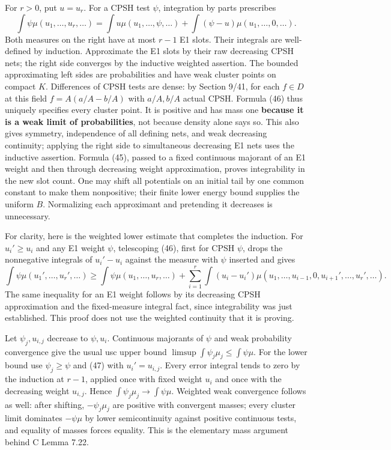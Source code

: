 \documentclass[
  10pt,
]{article}
\begin{document}
For \(r>0\), put \(u=u_r\). For a CPSH test \(\psi\), integration by
parts prescribes \[
 \int\psi\mu(u_1,\ldots,u_r,\ldots)
 =\int u\mu(u_1,\ldots,\psi,\ldots)
  +\int(\psi-u)\mu(u_1,\ldots,0,\ldots).                                                     \tag{46}
\] Both measures on the right have at most \(r-1\) E1 slots. Their
integrals are well-defined by induction. Approximate the E1 slots by
their raw decreasing CPSH nets; the right side converges by the
inductive weighted assertion. The bounded approximating left sides are
probabilities and have weak cluster points on compact \(K\). Differences
of CPSH tests are dense: by Section 9/41, for each \(f\in D\) at this
field \(f=A(a/A-b/A)\) with \(a/A,b/A\) actual CPSH. Formula (46) thus
uniquely specifies every cluster point. It is positive and has mass one
\textbf{because it is a weak limit of probabilities}, not because
density alone says so. This also gives symmetry, independence of all
defining nets, and weak decreasing continuity; applying the right side
to simultaneous decreasing E1 nets uses the inductive assertion. Formula
(45), passed to a fixed continuous majorant of an E1 weight and then
through decreasing weight approximation, proves integrability in the new
slot count. One may shift all potentials on an initial tail by one
common constant to make them nonpositive; their finite lower energy
bound supplies the uniform \(B\). Normalizing each approximant and
pretending it decreases is unnecessary.

For clarity, here is the weighted lower estimate that completes the
induction. For \(u_i'\geq u_i\) and any E1 weight \(\psi\), telescoping
(46), first for CPSH \(\psi\), drops the nonnegative integrals of
\(u_i'-u_i\) against the measure with \(\psi\) inserted and gives \[
 \int\psi\mu(u_1',\ldots,u_r',\ldots)
 \geq\int\psi\mu(u_1,\ldots,u_r,\ldots)
  +\sum_{i=1}^r\int(u_i-u_i')\mu(u_1,\ldots,u_{i-1},0,u_{i+1}',\ldots,u_r',\ldots).               \tag{47}
\] The same inequality for an E1 weight follows by its decreasing CPSH
approximation and the fixed-measure integral fact, since integrability
was just established. This proof does not use the weighted continuity
that it is proving.

Let \(\psi_j,u_{i,j}\) decrease to \(\psi,u_i\). Continuous majorants of
\(\psi\) and weak probability convergence give the usual usc upper bound
\(\limsup\int\psi_j\mu_j\leq\int\psi\mu\). For the lower bound use
\(\psi_j\geq\psi\) and (47) with \(u_i'=u_{i,j}\). Every error integral
tends to zero by the induction at \(r-1\), applied once with fixed
weight \(u_i\) and once with the decreasing weight \(u_{i,j}\). Hence
\(\int\psi_j\mu_j\to\int\psi\mu\). Weighted weak convergence follows as
well: after shifting, \(-\psi_j\mu_j\) are positive with convergent
masses; every cluster limit dominates \(-\psi\mu\) by lower
semicontinuity against positive continuous tests, and equality of masses
forces equality. This is the elementary mass argument behind C Lemma
7.22.
\end{document}
